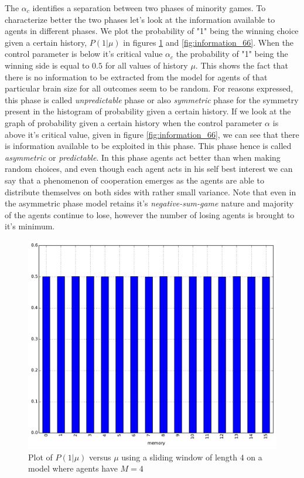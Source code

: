 The $\alpha_c$ identifies a separation between two phases of minority games.
To characterize better the two phases let's look at the information available to agents in different phases.
We plot the probability of "1" being the winning choice given a certain history, $P(1|\mu)$ in figures \ref{fig:information_44} and \ref{fig:information_66}.
When the control parameter is below it's critical value $\alpha_c$ the probability of "1" being the winning side is equal to $0.5$ for all values of history $\mu$.
This shows the fact that there is no information to be extracted from the model for agents of that particular brain size for all outcomes seem to be random.
For reasons expressed, this phase is called \textit{unpredictable} phase or also \textit{symmetric} phase for the symmetry present in the histogram of probability given a certain history.
If we look at the graph of probability given a certain history when the control parameter $\alpha$ is above it's critical value, given in figure \ref{fig:information_66}, we can see that there is information available to be exploited in this phase.
This phase hence is called \textit{asymmetric} or \textit{predictable}.
In this phase agents act better than when making random choices, and even though each agent acts in his self best interest we can say that a phenomenon of cooperation emerges as the agents are able to distribute themselves on both sides with rather small variance.
Note that even in the asymmetric phase model retains it's \textit{negative-sum-game} nature and majority of the agents continue to lose, however the number of losing agents is brought to it's minimum.


\begin{figure}[h]
\begin{center}
\includegraphics[scale=0.4]{images/minority/information_probability_m4_a4.pdf}
\caption{Plot of $P(1|\mu)$ versus $\mu$ using a sliding window of length $4$ on a model where agents have $M=4$}
\label{fig:information_44}
\end{center}
\end{figure}

